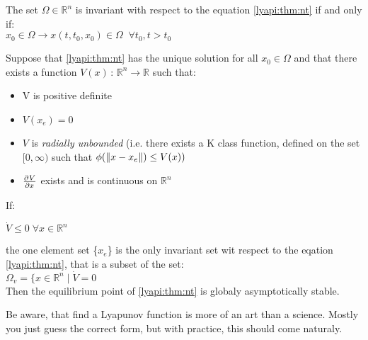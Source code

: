 {
    The set $\Omega \in \mathbb{R}^{n}$ is invariant with respect to the equation \ref{lyapi:thm:nt} if and only if:\\
    $x_0 \in \Omega \rightarrow x(t,t_0,x_0) \in \Omega \; \; \forall t_0, t>t_0 $
}
\thm{}
{
    Suppose that \ref{lyapi:thm:nt} has the unique solution for all $x_0 \in \Omega$ and that there exists a function $V(x)\,:\,\mathbb{R}^{n} \longrightarrow \mathbb{R} $ such that:
    \begin{itemize}
            \item V is positive definite
            \item $V(x_e) = 0$ 
            \item $V$ is \textit{radially unbounded} (i.e. there exists a K class function, defined on the set $[0,\infty)$ such that  $\phi(\lVert x-x_e\rVert) \le V(x))$
        \item $\frac{\partial^{}V}{\partial x^{}}$ exists and is continuous on $\mathbb{R}^{n}$ 

            
    \end{itemize}
    If:
    \begin{item}
    \item $\dot{V} \le 0 \; \forall x \in \mathbb{R}^{n} $
    \item the one element set \{$x_e$\} is the only invariant set wit respect to the eqation  \ref{lyapi:thm:nt}, that is a subset of the set:\\
        $\Omega_v = \{ x \in \mathbb{R}^{n} \mid \dot{V} = 0$\\
      Then the equilibrium point of \ref{lyapi:thm:nt} is globaly asymptotically stable.
    \end{item}
}
\nt
{
    Be aware, that find a Lyapunov function is more of an art than a science. Mostly you just guess the correct form, but with practice, this should come naturaly.
}
